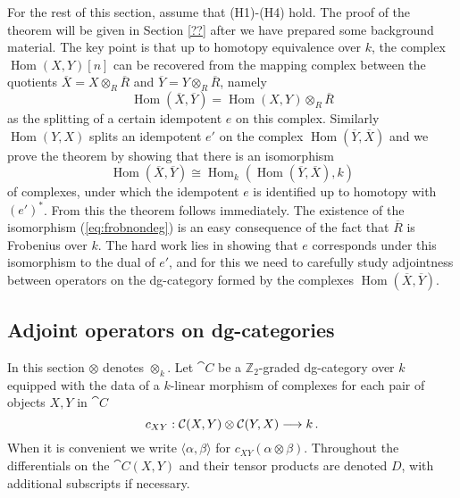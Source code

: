\documentclass{compositio}
\theoremstyle{definition}
\newtheorem{remark}[theorem]{Remark}
\numberwithin{equation}{section}
\def\Hom{\operatorname{Hom}}
\begin{document}

For the rest of this section, assume that (H1)-(H4) hold. The proof of the theorem will be given in Section \ref{??} after we have prepared some background material. The key point is that up to homotopy equivalence over $k$, the complex $\Hom(X,Y)[n]$ can be recovered from the mapping complex between the quotients $\overline{X} = X \otimes_R \overline{R}$ and $\overline{Y} = Y \otimes_R \overline{R}$, namely
\[
\Hom(\overline{X},\overline{Y}) = \Hom(X,Y) \otimes_R \overline{R}
\]
as the splitting of a certain idempotent $e$ on this complex. Similarly $\Hom(Y,X)$ splits an idempotent $e'$ on the complex $\Hom(\overline{Y}, \overline{X})$ and we prove the theorem by showing that there is an isomorphism
\begin{equation}\label{eq:frobnondeg}
\Hom(\overline{X}, \overline{Y}) \cong \Hom_k( \Hom(\overline{Y}, \overline{X}), k)
\end{equation}
of complexes, under which the idempotent $e$ is identified up to homotopy with $(e')^*$. From this the theorem follows immediately. The existence of the isomorphism (\ref{eq:frobnondeg}) is an easy consequence of the fact that $\overline{R}$ is Frobenius over $k$. The hard work lies in showing that $e$ corresponds under this isomorphism to the dual of $e'$, and for this we need to carefully study adjointness between operators on the dg-category formed by the complexes $\Hom(\overline{X}, \overline{Y})$.

\subsection{Adjoint operators on dg-categories}

In this section $\otimes$ denotes $\otimes_k$. Let $\cat{C}$ be a $\mathbb{Z}_2$-graded dg-category over $k$ equipped with the data of a $k$-linear morphism of complexes for each pair of objects $X,Y$ in $\cat{C}$
\[
c_{XY}: \mathcal{C}(X,Y) \otimes \mathcal{C}(Y,X) \longrightarrow k\,.
\]
When it is convenient we write $\langle \alpha, \beta \rangle$ for $c_{XY}(\alpha \otimes \beta)$. Throughout the differentials on the $\cat{C}(X,Y)$ and their tensor products are denoted $D$, with additional subscripts if necessary.
\end{document}
